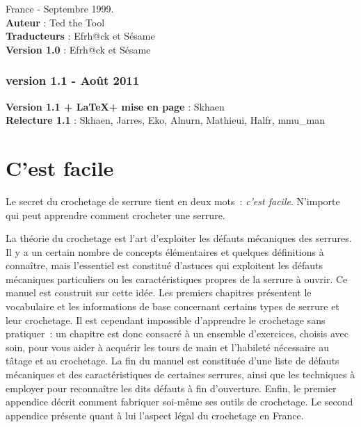 \documentclass[a4paper,french,11pt,twoside]{report}
\begin{document}
\noindent France - Septembre 1999.\\
\noindent \textbf{Auteur} : Ted the Tool \\
\noindent \textbf{Traducteurs} : Efrh@ck et Sésame \\
\noindent \textbf{Version 1.0} : Efrh@ck et Sésame \\

{\centering \subsection*{version 1.1 - Août 2011}}

\medskip
\noindent \textbf{Version 1.1 + \LaTeX + mise en page} : Skhaen \\
\noindent \textbf{Relecture 1.1} : Skhaen, Jarres, Eko, Alnurn, Mathieui, Halfr, mmu\_man \\

\newpage
\strut
\newpage


\tableofcontents
\newpage

\chapter{\label{chap:cest_facile}C'est facile}

Le secret du crochetage de serrure tient en deux mots~: \emph{c'est facile}. N'importe qui peut apprendre comment crocheter une serrure.

\medskip
La théorie du crochetage est l'art d'exploiter les défauts mécaniques des serrures. Il y a un certain nombre de concepts élémentaires et quelques définitions à connaître, mais l'essentiel est constitué d'astuces qui exploitent les défauts mécaniques particuliers ou les caractéristiques propres de la serrure à ouvrir. Ce manuel est construit sur cette idée. Les premiers chapitres présentent le vocabulaire et les informations de base concernant certains types de serrure et leur crochetage. Il est cependant impossible d'apprendre le crochetage sans pratiquer~: un chapitre est donc consacré à un ensemble d'exercices, choisis avec soin, pour vous aider à acquérir les tours de main et l'habileté nécessaire au tâtage et au crochetage. La fin du manuel est constituée d'une liste de défauts mécaniques et des caractéristiques de certaines serrures, ainsi que les techniques à employer pour reconnaître les dits défauts à fin d'ouverture. Enfin, le premier appendice décrit comment fabriquer soi-même ses outils de crochetage. Le second appendice présente quant à lui l'aspect légal du crochetage en France.
\end{document}
